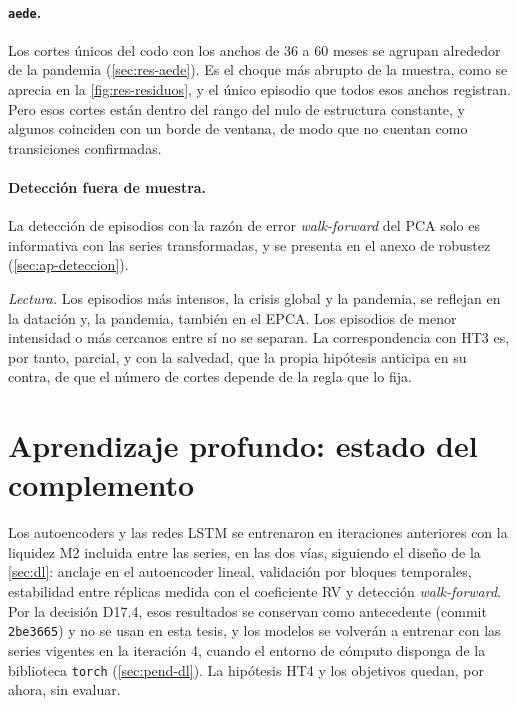 \paragraph{\texttt{aede}.} Los cortes únicos del codo con los anchos de 36 a 60 meses se agrupan
alrededor de la pandemia (\cref{sec:res-aede}). Es el choque más abrupto de la muestra, como se aprecia en la \cref{fig:res-residuos}, y el único
episodio que todos esos anchos registran. Pero esos cortes están dentro del rango del nulo de estructura
constante, y algunos coinciden con un borde de ventana, de modo que no cuentan como transiciones
confirmadas.

\paragraph{Detección fuera de muestra.} La detección de episodios con la razón de error
\emph{walk-forward} del PCA solo es informativa con las series transformadas, y se presenta en el
anexo de robustez (\cref{sec:ap-deteccion}).

\emph{Lectura.} Los episodios más intensos, la crisis global y la pandemia, se reflejan en la
datación y, la pandemia, también en el EPCA. Los episodios de menor intensidad o más cercanos entre
sí no se separan. La correspondencia con HT3 es, por tanto, parcial, y con la salvedad, que la
propia hipótesis anticipa en su contra, de que el número de cortes depende de la regla que lo fija.

\section{Aprendizaje profundo: estado del complemento}
\label{sec:res-dl}

Los autoencoders y las redes LSTM se entrenaron en iteraciones anteriores con la liquidez M2
incluida entre las series, en las dos vías, siguiendo el diseño de la \cref{sec:dl}: anclaje en el
autoencoder lineal, validación por bloques temporales, estabilidad entre réplicas medida con el
coeficiente RV y detección \emph{walk-forward}. Por la decisión D17.4, esos resultados se conservan
como antecedente (commit \texttt{2be3665}) y no se usan en esta tesis, y los modelos se volverán a
entrenar con las \nSeries{} series vigentes en la iteración 4, cuando el entorno de cómputo disponga
de la biblioteca \texttt{torch} (\cref{sec:pend-dl}). La hipótesis HT4 y los objetivos
 quedan, por ahora, sin evaluar.

